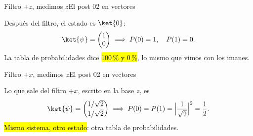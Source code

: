 \documentclass[12pt]{beamer}
\newcommand\sgpass[2]{%
  \draw[igAccentB, line width=0.8pt] (#1+7,2.1) .. controls +(4,0) and +(-4,0) .. (#2-7,0);}
\newcommand\sgblock[1]{%
  \draw[igMuted, line width=0.8pt] (#1+7,-2.1) -- (#1+10,-2.1);
  \draw[igMuted, line width=1.6pt] (#1+10,-3.6) -- (#1+10,-0.6);}
\newcommand\sgout[3]{%
  \draw[igAccentB, line width=0.8pt] (#1+7,2.1) -- (#1+10,4.5);
  \draw[igAccentB, line width=0.8pt] (#1+7,-2.1) -- (#1+10,-4.5);
  \node[badge] at (#1+10,4.5) {#2};
  \node[badge] at (#1+10,-4.5) {#3};}
\newcommand\fade[2]{{\transparent{#1}#2}}                 %
\def\anAtomsC{}\def\anUpC{100\,\%}\def\anDnC{0\,\%}\def\anTxtA{1}\def\anTxtB{1}
\def\anAtomsD{}\def\anUpD{50\,\%}\def\anDnD{50\,\%}\def\anTxtC{1}\def\anTxtD{1}
\begin{document}
\begin{frame}{Filtro $+z$, medimos $z$}{El post 02 en vectores}
\begin{center}
\end{center}
\fade{\anTxtA}{Después del filtro, el estado es $\ket{0}$:
\[
  \ket{\psi} = \begin{pmatrix} 1 \\ 0 \end{pmatrix}
  \;\Longrightarrow\;
  P(0) = 1,\quad P(1) = 0 .
\]}%
\fade{\anTxtB}{La tabla de probabilidades dice \hl{100\,\% y 0\,\%}, lo mismo
que vimos con los imanes.}
\end{frame}

\begin{frame}{Filtro $+x$, medimos $z$}{El post 02 en vectores}
\begin{center}
\end{center}
\fade{\anTxtC}{Lo que sale del filtro $+x$, escrito en la base $z$, es
\[
  \ket{\psi} = \begin{pmatrix} 1/\sqrt{2} \\[0.5mm] 1/\sqrt{2} \end{pmatrix}
  \;\Longrightarrow\;
  P(0) = P(1) = \Big|\frac{1}{\sqrt{2}}\Big|^2 = \frac12 .
\]}%
\fade{\anTxtD}{\hl{Mismo sistema, otro estado}: otra tabla de probabilidades.}
\end{frame}
\end{document}
